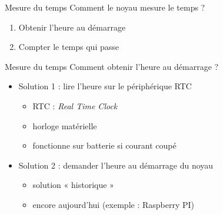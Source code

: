 \def\inc{inc5-time}




\begin {frame} {Mesure du temps}
    Comment le noyau mesure le temps ?

    \begin {enumerate}
	\item Obtenir l'heure au démarrage
	\item Compter le temps qui passe
    \end {enumerate}
\end {frame}

\begin {frame} {Mesure du temps}
    Comment obtenir l'heure au démarrage ?
    \begin {itemize}
	\item Solution 1 : lire l'heure sur le périphérique RTC

	    \begin {itemize}
		\item RTC : \textit {Real Time Clock}
		\item horloge matérielle
		\item fonctionne sur batterie si courant coupé
	    \end {itemize}

	\item Solution 2 : demander l'heure au démarrage du noyau

	    \begin {itemize}
		\item solution « historique »
		\item encore aujourd'hui (exemple : Raspberry PI)
	    \end {itemize}

    \end {itemize}
\end {frame}

